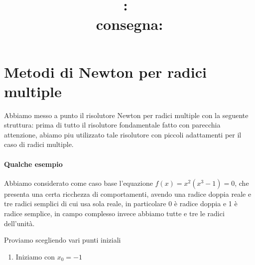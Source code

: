 \documentclass[11pt,a4paper]{article}
\title{
	\vspace{1cm}
	\textmd{\hmwkClass:\ \hmwkTitle}\\
	\vspace{.5cm}
	\small{consegna: \textit{\hmwkDueDate}} }
\author{\hmwkAuthorName}
\date{}
\theoremstyle{definition}
\begin{document}
\maketitle

\section{Metodi di Newton per radici multiple}
Abbiamo messo a punto il risolutore Newton per radici multiple con la seguente struttura: prima di tutto il risolutore fondamentale fatto con parecchia attenzione, abiamo piu utilizzato tale risolutore con piccoli adattamenti per il caso di radici multiple. 

\paragraph{Qualche esempio}
Abbiamo considerato come caso base l'equazione $f(x)=x^2(x^3-1)=0$, che presenta una certa ricchezza di comportamenti, avendo una radice doppia reale e tre radici semplici di cui usa sola reale, in particolare $0$ è radice doppia e 1 è radice semplice, in campo complesso invece abbiamo tutte e tre le radici dell'unità.

Proviamo scegliendo vari punti iniziali

\begin{enumerate}
	\item Iniziamo con $x_0=-1$
\end{enumerate}

\printbibliography
\end{document}
